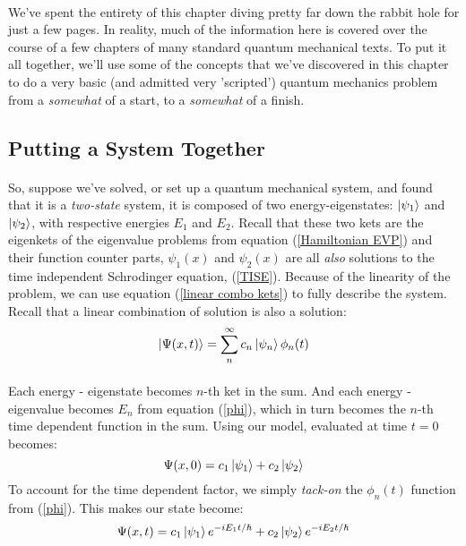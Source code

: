 \documentclass[12pt,letterpaper]{book}
\begin{document}
\paragraph*{}We've spent the entirety of this chapter diving pretty far down the rabbit hole for just a few pages. In reality, much of the information here is covered over the course of a few chapters of many standard quantum mechanical texts. To put it all together, we'll use some of the concepts that we've discovered in this chapter to do a very basic (and admitted very 'scripted') quantum mechanics problem from a \textit{somewhat} of a start, to a \textit{somewhat} of a finish. 


\subsection*{Putting a System Together}

\paragraph*{}So, suppose we've solved, or set up a quantum mechanical system, and found that it is a \textit{two-state} system, it is composed of two energy-eigenstates: 
$\ket{\psi_1}$ and $\ket{\psi_2}$, with respective energies $E_1$ and $E_2$.  Recall that these two kets are the eigenkets of the eigenvalue problems from equation (\ref{Hamiltonian EVP}) and their function counter parts, $\psi_1(x)$ and $\psi_2(x)$ are all \textit{also} solutions to the time independent Schrodinger equation, (\ref{TISE}). Because of the linearity of the problem, we can use equation (\ref{linear combo kets}) to fully describe the system. Recall that a linear combination of solution is also a solution:
\begin{equation}
\ket{\Psi(x,t)} = \sum_n^{\infty} c_n \ket{\psi_n} \phi_n(t)
\end{equation}

\paragraph*{}Each energy - eigenstate becomes $n$-th ket in the sum. And each energy - eigenvalue becomes $E_n$ from equation (\ref{phi}), which in turn becomes the $n$-th time dependent function in the sum. Using our model, evaluated at time $t=0$ becomes:
\begin{equation}
\Psi(x,0) = c_1 \ket{\psi_1} + c_2 \ket{\psi_2} 
\end{equation}
To account for the time dependent factor, we simply \textit{tack-on} the $\phi_n(t)$ function from (\ref{phi}). This makes our state become:
\begin{equation}
\Psi(x,t) = c_1 \ket{\psi_1}e^{-iE_1t/\hbar} + c_2 \ket{\psi_2} e^{-iE_2t/\hbar}
\end{equation}
\end{document}
